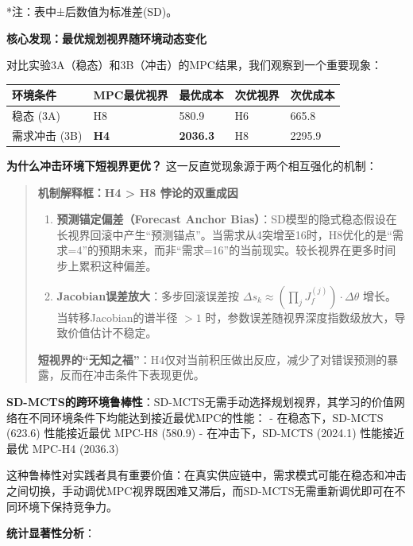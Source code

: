 \documentclass[UTF8]{ctexart}
\begin{document}
*注：表中±后数值为标准差(SD)。

\textbf{核心发现：最优规划视界随环境动态变化}

对比实验3A（稳态）和3B（冲击）的MPC结果，我们观察到一个重要现象：

\begin{table}[h]
\centering
\begin{tabular}{p{3.5cm}p{3cm}p{2.5cm}p{2.5cm}p{2.5cm}}
\toprule
\textbf{环境条件} & \textbf{MPC最优视界} & \textbf{最优成本} & \textbf{次优视界} & \textbf{次优成本} \\
\midrule
稳态 (3A) & H8 & 580.9 & H6 & 665.8 \\
需求冲击 (3B) & \textbf{H4} & \textbf{2036.3} & H8 & 2295.9 \\
\bottomrule
\end{tabular}
\end{table}

\textbf{为什么冲击环境下短视界更优？}
这一反直觉现象源于两个相互强化的机制：

\begin{quote}
\textbf{机制解释框：H4 \textgreater{} H8 悖论的双重成因}

\begin{enumerate}
\def\labelenumi{\arabic{enumi}.}
\item
  \textbf{预测锚定偏差（Forecast Anchor
  Bias）}：SD模型的隐式稳态假设在长视界回滚中产生``预测锚点''。当需求从4突增至16时，H8优化的是``需求=4''的预期未来，而非``需求=16''的当前现实。较长视界在更多时间步上累积这种偏差。
\item
  \textbf{Jacobian误差放大}：多步回滚误差按
  \(\Delta s_k \approx (\prod_{j} J_f^{(j)}) \cdot \Delta\theta\)
  增长。当转移Jacobian的谱半径 \(> 1\)
  时，参数误差随视界深度指数级放大，导致价值估计不稳定。
\end{enumerate}

\textbf{短视界的``无知之福''}：H4仅对当前积压做出反应，减少了对错误预测的暴露，反而在冲击条件下表现更优。
\end{quote}

\textbf{SD-MCTS的跨环境鲁棒性}：SD-MCTS无需手动选择规划视界，其学习的价值网络在不同环境条件下均能达到接近最优MPC的性能：
- 在稳态下，SD-MCTS (623.6) 性能接近最优 MPC-H8 (580.9) -
在冲击下，SD-MCTS (2024.1) 性能接近最优 MPC-H4 (2036.3)

这种鲁棒性对实践者具有重要价值：在真实供应链中，需求模式可能在稳态和冲击之间切换，手动调优MPC视界既困难又滞后，而SD-MCTS无需重新调优即可在不同环境下保持竞争力。

\textbf{统计显著性分析}：
\end{document}
